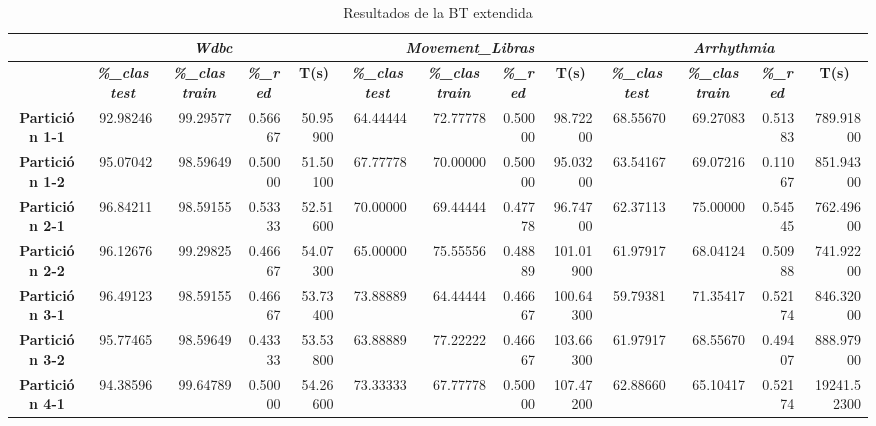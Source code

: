 \documentclass[a4paper,11pt]{article}
\begin{document}
  \begin{table}[H]	
    \caption*{Resultados de la BT extendida}
    \begin{adjustbox}{width=1.1\textwidth}
   \begin{tabular}{|c|r|r|r|r|r|r|r|r|r|r|r|r|}
    \hline
    \multicolumn{1}{|l|}{} & \multicolumn{ 4}{c|}{\textbf{\textit{Wdbc}}} & \multicolumn{ 4}{c|}{\textbf{\textit{Movement\_Libras}}} & \multicolumn{ 4}{c|}{\textbf{\textit{Arrhythmia}}} \\ \hline
    & \multicolumn{1}{c|}{\textbf{\textit{\%\_clas test}}} & \multicolumn{1}{c|}{\textbf{\textit{\%\_clas train}}} & \multicolumn{1}{c|}{\textbf{\textit{\%\_red}}} & \multicolumn{1}{c|}{\textbf{T(s)}} & \multicolumn{1}{c|}{\textbf{\textit{\%\_clas test}}} & \multicolumn{1}{c|}{\textbf{\textit{\%\_clas train}}} & \multicolumn{1}{c|}{\textbf{\textit{\%\_red}}} & \multicolumn{1}{c|}{\textbf{T(s)}} & \multicolumn{1}{c|}{\textbf{\textit{\%\_clas test}}} & \multicolumn{1}{c|}{\textbf{\textit{\%\_clas train}}} & \multicolumn{1}{c|}{\textbf{\textit{\%\_red}}} & \multicolumn{1}{c|}{\textbf{T(s)}} \\ \hline
    \textbf{Partición 1-1} & 92.98246 & 99.29577 & 0.56667 & 50.95900 & 64.44444 & 72.77778 & 0.50000 & 98.72200 & 68.55670 & 69.27083 & 0.51383 & 789.91800 \\ \hline
    \textbf{Partición 1-2} & 95.07042 & 98.59649 & 0.50000 & 51.50100 & 67.77778 & 70.00000 & 0.50000 & 95.03200 & 63.54167 & 69.07216 & 0.11067 & 851.94300 \\ \hline
    \textbf{Partición 2-1} & 96.84211 & 98.59155 & 0.53333 & 52.51600 & 70.00000 & 69.44444 & 0.47778 & 96.74700 & 62.37113 & 75.00000 & 0.54545 & 762.49600 \\ \hline
    \textbf{Partición 2-2} & 96.12676 & 99.29825 & 0.46667 & 54.07300 & 65.00000 & 75.55556 & 0.48889 & 101.01900 & 61.97917 & 68.04124 & 0.50988 & 741.92200 \\ \hline
    \textbf{Partición 3-1} & 96.49123 & 98.59155 & 0.46667 & 53.73400 & 73.88889 & 64.44444 & 0.46667 & 100.64300 & 59.79381 & 71.35417 & 0.52174 & 846.32000 \\ \hline
    \textbf{Partición 3-2} & 95.77465 & 98.59649 & 0.43333 & 53.53800 & 63.88889 & 77.22222 & 0.46667 & 103.66300 & 61.97917 & 68.55670 & 0.49407 & 888.97900 \\ \hline
    \textbf{Partición 4-1} & 94.38596 & 99.64789 & 0.50000 & 54.26600 & 73.33333 & 67.77778 & 0.50000 & 107.47200 & 62.88660 & 65.10417 & 0.52174 & 19241.52300 \\ \hline

\end{tabular}
\end{adjustbox}
\end{table}
\end{document}
